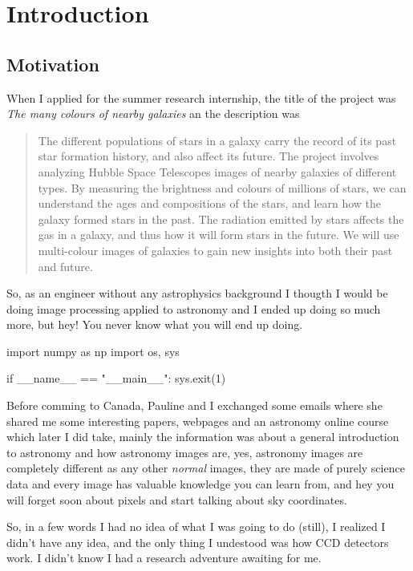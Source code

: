 \documentclass[11pt,fleqn]{book} %
\begin{document}

\chapter{Introduction}
\section{Motivation}
When I applied for the summer research internship, the title of the project was \emph{The many colours of nearby galaxies} an the description was
\begin{quote}
The different populations of stars in a galaxy carry the record of its past star formation history, and also affect its future. The project involves  analyzing Hubble Space Telescopes images of nearby galaxies of different types. By measuring the brightness and colours of millions of stars, we can understand the ages and compositions of the stars, and learn how the galaxy formed stars in the past. The radiation emitted by stars affects the gas in a galaxy, and thus how it will form stars in the future. We will use multi-colour images of galaxies to gain new insights into both their past and future.
\end{quote}

So, as an engineer without any astrophysics background I thougth I would be doing image processing applied to astronomy and I ended up doing so much more, but hey! You never know what you will end up doing.
\begin{pyglist}[language=python]
import numpy as np
import os, sys

if __name__ == "__main__":
    sys.exit(1)
\end{pyglist}

Before comming to Canada, Pauline and I exchanged some emails where she shared me some interesting papers, webpages and an astronomy online course which later I did take, mainly the information was about a general introduction to astronomy and how astronomy images are, yes, astronomy images are completely different as any other \emph{normal} images, they are made of purely science data and every image has valuable knowledge you can learn from, and hey you will forget soon about pixels and start talking about sky coordinates.

So, in a few words I had no idea of what I was going to do (still), I realized I didn't have any idea, and the only thing I undestood was how CCD detectors work. I didn't know I had a research adventure awaiting for me.
\end{document}

